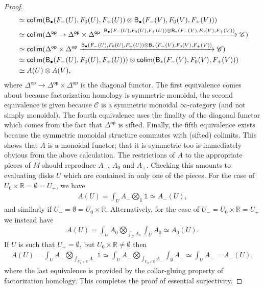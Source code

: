 \documentclass[12pt,a4paper]{article}
\theoremstyle{definition}
\theoremstyle{plain}
\theoremstyle{remark}
\newcommand{\catC}{\mathscr{C}}
\begin{document}
\begin{proof}
\begin{align}
        &\simeq \mathsf{colim} (\mathsf{B}_{\bullet} (F_-(U), F_0(U), F_+(U)) \otimes \mathsf{B}_{\bullet} (F_-(V), F_0(V), F_+(V)))\notag\\
        &\simeq \mathsf{colim} (\Delta^{\mathsf{op}} \rightarrow \Delta^{\mathsf{op}} \times \Delta^{\mathsf{op}} \xrightarrow{\mathsf{B}_{\bullet} (F_-(U), F_0(U), F_+(U)) \otimes \mathsf{B}_{*} (F_-(V), F_0(V), F_+(V))} \catC)\notag\\
        &\simeq \mathsf{colim} (\Delta^{\mathsf{op}} \times \Delta^{\mathsf{op}} \xrightarrow{\mathsf{B}_{\bullet} (F_-(U), F_0(U), F_+(U)) \otimes \mathsf{B}_{*} (F_-(V), F_0(V), F_+(V))} \catC)\notag\\
        &\simeq \mathsf{colim} (\mathsf{B}_{\bullet} (F_-(U), F_0(U), F_+(U))) \otimes \mathsf{colim} (\mathsf{B}_{*} (F_-(V), F_0(V), F_+(V)))\notag\\
        &\simeq A(U) \otimes A(V),
    \end{align}
    where $\Delta^{\mathsf{op}} \rightarrow \Delta^{\mathsf{op}} \times \Delta^{\mathsf{op}}$ is the diagonal functor. The first equivalence comes about because factorization homology is symmetric monoidal, the second equivalence is given because $\catC$ is a symmetric monoidal $\infty$-category (and not simply monoidal). The fourth equivalence uses the finality of the diagonal functor which comes from the fact that $\Delta^{\mathsf{op}}$ is sifted. Finally, the fifth equivalence exists because the symmetric monoidal structure commutes with (sifted) colimits. This shows that $A$ is a monoidal functor; that it is symmetric too is immediately obvious from the above calculation. The restrictions of $A$ to the appropriate pieces of $M$ should reproduce $A_-$, $A_0$ and $A_+$. Checking this amounts to evaluating disks $U$ which are contained in only one of the pieces. For the case of $U_0 \times \mathbb{R} = \emptyset = U_+$, we have
    \begin{align}
        A(U) = \int_{U} A_- \bigotimes\limits_{\mathbb{1}} \mathbb{1} \simeq A_- (U),
    \end{align}
    and similarly if $U_- = \emptyset = U_0 \times \mathbb{R}$. Alternatively, for the case of $U_- = U_0 \times \mathbb{R} = U_+$ we instead have
    \begin{align}
        A(U) = \int_U A_0 \bigotimes\limits_{\int_{U} A_0} \int_U A_0 \simeq A_0(U).
    \end{align}
    If $U$ is such that $U_+ = \emptyset$, but $U_0 \times \mathbb{R} \neq \emptyset$ then
    \begin{align}
        A(U) = \int_U A_- \bigotimes\limits_{\int_{U_0 \times \mathbb{R}} A_-} \mathbb{1} \simeq \int_U A_- \bigotimes\limits_{\int_{U_0 \times \mathbb{R}} A_-} \int_{\emptyset} A_- \simeq \int_{U} A_- = A_-(U),
    \end{align}
    where the last equivalence is provided by the collar-gluing property of factorization homology. This completes the proof of essential surjectivity.


\end{proof}
\end{document}
